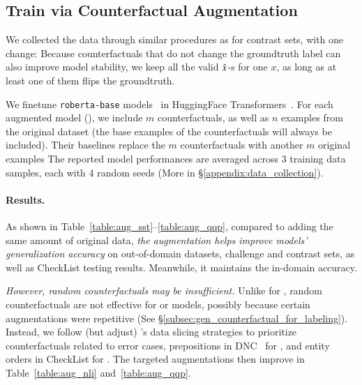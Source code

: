 \subsection{Train via Counterfactual Augmentation}
\label{subsec:augmentation}
We collected the data through similar procedures as for contrast sets, with one change:
Because counterfactuals that do not change the groundtruth label can also improve model stability, we keep all the valid $\hat{x}$-s for one $x$, as long as at least one of them flips the groundtruth.

We finetune \texttt{roberta-base} models~\cite{liu2019roberta} in HuggingFace Transformers~\cite{Wolf2019HuggingFacesTS}.
For each augmented model (\maug), we include $m$ counterfactuals, as well as $n$ examples from the original dataset (the base examples of the counterfactuals will always be included).
Their baselines \mcomp replace the $m$ counterfactuals with another $m$ original examples
The reported model performances are averaged across 3 training data samples, each with 4 random seeds (More in \S\ref{appendix:data_collection}).

\paragraph{Results.}
As shown in Table~\ref{table:aug_sst}--\ref{table:aug_qqp}, compared to adding the same amount of original data, \emph{the augmentation helps improve models' generalization accuracy} on out-of-domain datasets, challenge and contrast sets, as well as CheckList testing results.
Meanwhile, it maintains the in-domain accuracy.

\TableAugQQP


\emph{However, random counterfactuals may be insufficient.}
Unlike for \sst, random counterfactuals are not effective for \nli or \qqp models, possibly because certain augmentations were repetitive (See \S\ref{subsec:gen_counterfactual_for_labeling}).
Instead, we follow (but adjust) \citet{chen2019slice}'s data slicing strategies to prioritize counterfactuals related to error cases, \eg prepositions in DNC~\cite{kim2019probing} for \nli, and entity orders in CheckList for \qqp.
The targeted augmentations then improve \maug in Table~\ref{table:aug_nli} and~\ref{table:aug_qqp}.

